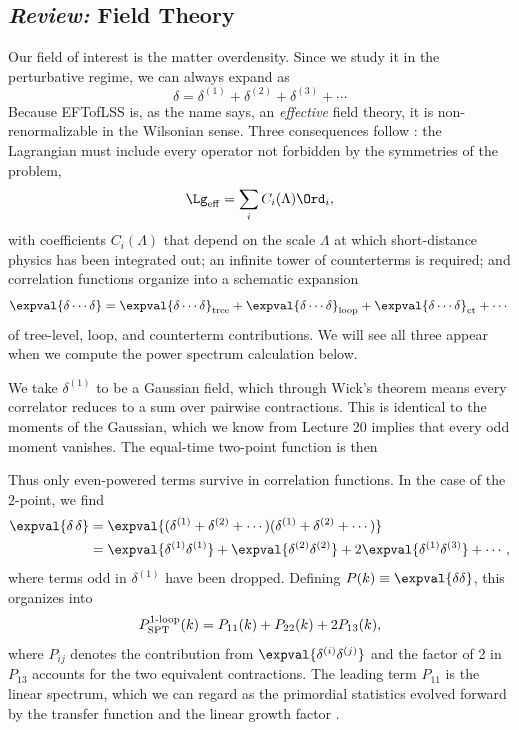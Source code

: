 \subsection{\textit{Review:} Field Theory}
Our field of interest is the matter overdensity. Since we study it in the perturbative 
regime, we can always expand as
\begin{equation}
    \delta=\delta^{(1)}+\delta^{(2)}+\delta^{(3)}+\cdots
\end{equation}
Because EFTofLSS is, as the name says, an \textit{effective} field theory, 
it is non-renormalizable in the Wilsonian sense. Three consequences follow 
\citep[Chs.~21--22]{SchwartzQFT}: the Lagrangian must include every 
operator not forbidden by the symmetries of the problem,
\begin{equation}
    \Lg_{\rm eff}=\sum_i C_i(\Lambda) \Ord_{i},
\end{equation}
with coefficients $C_i(\Lambda)$ that depend on the scale $\Lambda$ at 
which short-distance physics has been integrated out; an infinite tower 
of counterterms is required; and correlation functions organize into a 
schematic expansion
\begin{equation}
    \expval{\delta\cdots\delta}
    =
    \expval{\delta\cdots\delta}_{\rm tree}
    +\expval{\delta\cdots\delta}_{\rm loop}
    +\expval{\delta\cdots\delta}_{\rm ct}
    +\cdots
\end{equation}
of tree-level, loop, and counterterm contributions. We will see all three 
appear when we compute the power spectrum calculation below. 

We take $\delta^{(1)}$ to be a Gaussian field, which through Wick's 
theorem means every correlator reduces to a sum over pairwise 
contractions. This is identical to the moments of the Gaussian, which we know from Lecture 20 \citep{Dvorkin2026} implies that every odd moment vanishes. The 
equal-time two-point function is then

Thus only even-powered terms survive in correlation functions. In the case of the $2$-point, we find
\begin{align}
    \expval{\delta\,\delta}
    &=\expval{(\delta^{(1)}+\delta^{(2)}+\cdots)(\delta^{(1)}+\delta^{(2)}+\cdots)}\\
    &=\expval{\delta^{(1)}\delta^{(1)}}
     +\expval{\delta^{(2)}\delta^{(2)}}
     +2\expval{\delta^{(1)}\delta^{(3)}}
     +\cdots,
\end{align}
where terms odd in $\delta^{(1)}$ have been dropped. Defining 
$P(k)\equiv\expval{\delta\delta}$, this organizes into
\begin{equation}
    P_{\rm SPT}^{\rm 1\text{-}loop}(k)=P_{11}(k)+P_{22}(k)+2P_{13}(k),
\end{equation}
where $P_{ij}$ denotes the contribution from $\expval{\delta^{(i)}\delta^{(j)}}$ 
and the factor of 2 in $P_{13}$ accounts for the two equivalent 
contractions. The leading term $P_{11}$ is the linear spectrum, which we 
can regard as the primordial statistics evolved forward by the transfer 
function and the linear growth factor \citep{Dvorkin2026}.

